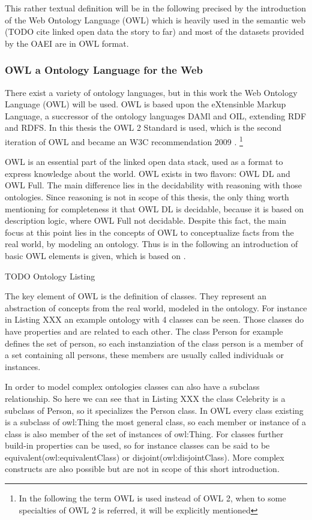 \documentclass[11pt,titlepage,oneside,openany,a4paper]{report}
\begin{document}
This rather textual definition will be in the following precised by the introduction of the Web Ontology Language (OWL) which is  heavily used in the semantic web (TODO cite linked open data the story to far) and most of the datasets provided by the OAEI are in OWL format. \cite{dragisicresults}
\subsubsection{OWL a Ontology Language for the Web}
There exist a variety of ontology languages, but in this work the Web Ontology Language (OWL) will be used. OWL is based upon the eXtensinble Markup Language, a succressor of the ontology languages DAMl and OIL, extending RDF and RDFS. In this thesis the OWL 2 Standard is used, which is the second iteration of OWL and became an W3C recommendation 2009 \cite{OWL2a}. \footnote{In the following the term OWL is used instead of OWL 2, when to some specialties of OWL 2 is referred, it will be explicitly mentioned}

OWL is an essential part of the linked open data stack, used as a format to express knowledge about the world. OWL exists in two flavors: OWL DL and OWL Full. The main difference lies in the decidability with reasoning with those ontologies. Since reasoning is not in scope of this thesis, the only thing worth mentioning for completeness it that OWL DL is decidable, because it is based on description logic, where OWL Full not decidable. Despite this fact, the main focus at this point lies in the concepts of OWL to conceptualize facts from the real world, by modeling an ontology. Thus is in the following an introduction of basic OWL elements is given, which is based on \cite{Antoniou:2012}.

\begin{Huge}
TODO Ontology Listing
\end{Huge}

The key element of OWL is the definition of classes. They represent an abstraction of concepts from the real world, modeled in the ontology. For instance in Listing XXX  an example ontology with 4 classes can be seen. Those classes do have properties and are related to each other. The class Person for example defines the set of person, so each instanziation of the class person is a member of a set containing all persons, these members are usually called individuals or instances.

In order to model complex ontologies classes can also have a subclass relationship. So here we can see that in Listing XXX the class Celebrity is a subclass of Person, so it specializes the Person class. In OWL every class existing is  a subclass of owl:Thing the most general class, so each member or instance of a class is also member of the set of instances of owl:Thing. For classes further build-in properties can be used, so for instance classes can be said to be equivalent(owl:equivalentClass) or disjoint(owl:disjointClass). More complex constructs are also possible but are not in scope of this short introduction.
\end{document}
